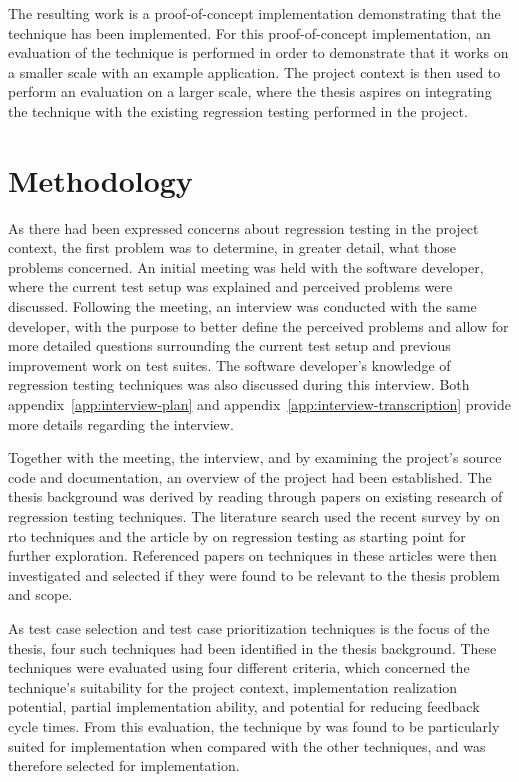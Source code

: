\documentclass[a4paper,english,12pt]{report}
\begin{document}
The resulting work is a proof-of-concept implementation demonstrating that the technique has been implemented. For this proof-of-concept implementation, an evaluation of the technique is performed in order to demonstrate that it works on a smaller scale with an example application. The project context is then used to perform an evaluation on a larger scale, where the thesis aspires on integrating the technique with the existing regression testing performed in the project.

\section{Methodology}
As there had been expressed concerns about regression testing in the project context, the first problem was to determine, in greater detail, what those problems concerned. An initial meeting was held with the software developer, where the current test setup was explained and perceived problems were discussed. Following the meeting, an interview was conducted with the same developer, with the purpose to better define the perceived problems and allow for more detailed questions surrounding the current test setup and previous improvement work on test suites. The software developer's knowledge of regression testing techniques was also discussed during this interview. Both appendix~\ref{app:interview-plan} and appendix~\ref{app:interview-transcription} provide more details regarding the interview.

Together with the meeting, the interview, and by examining the project's source code and documentation, an overview of the project had been established. The thesis background was derived by reading through papers on existing research of regression testing techniques. The literature search used the recent survey by \citet{anwar2014exploration} on \gls{rto} techniques and the article by \citet{runeson2012regression} on regression testing as starting point for further exploration. Referenced papers on techniques in these articles were then investigated and selected if they were found to be relevant to the thesis problem and scope.

As test case selection and test case prioritization techniques is the focus of the thesis, four such techniques had been identified in the thesis background. These techniques were evaluated using four different criteria, which concerned the technique's suitability for the project context, implementation realization potential, partial implementation ability, and potential for reducing feedback cycle times. From this evaluation, the technique by \citet{mansour2009regression} was found to be particularly suited for implementation when compared with the other techniques, and was therefore selected for implementation.
\end{document}
